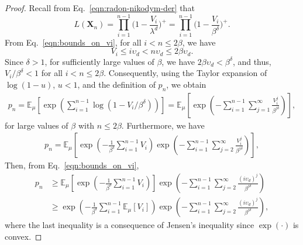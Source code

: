 \documentclass[pdflatex, sn-mathphys-ay]{sn-jnl}%
\renewcommand{\v}[1]{\boldsymbol{#1}}
\newcommand{\ee}{\mathbb{E}}
\newcommand{\mX}{\v{X}}
\newcommand{\lt}{\left}
\newcommand{\rt}{\right}
\theoremstyle{thmstyleone}%
\theoremstyle{thmstyletwo}%
\theoremstyle{thmstylethree}%
\begin{document}
\begin{appendices}
\begin{proof}
Recall from Eq.~\eqref{eqn:radon-nikodym-der} that 
\[
L(\mX_n) = \prod_{i=1}^{n-1}\Big(1 - \frac{ V_{i}}{\lambda^d}\Big)^+ = \prod_{i=1}^{n-1}\Big(1 - \frac{ V_{i}}{\beta^\delta}\Big)^+.
\]
From Eq.~\eqref{eqn:bounds_on_vi}, for all $i < n \leq 2\beta$, we have 
\[
V_i \leq i\upsilon_d < n \upsilon_d \leq 2\beta \upsilon_d.
\]
Since $\delta > 1$, for sufficiently large values of $\beta$, we have 
$2\beta \upsilon_d < \beta^{\delta}$, and thus, $V_i/\beta^\delta < 1$ for all $i < n \leq 2\beta$.
Consequently, using the Taylor expansion of $\log(1 - u)$, $u < 1$, and the definition of $p_n$, we obtain
\begin{align*}
    p_n = \ee_\mu \lt[\exp\lt( \sum_{i = 1}^{n -1} \log(1 - V_i/\beta^{\delta})\rt) \rt]
        = \ee_\mu \lt[\exp\lt( - \sum_{i = 1}^{n -1} \sum_{j = 1}^\infty \frac{V_i^j}{\beta^{j\delta}}\rt) \rt],
\end{align*}
for large values of $\beta$ with $n \leq 2\beta$. Furthermore, we have
\begin{align*}
    p_n = \ee_\mu \lt[\exp\lt( - \frac{1}{\beta^{\delta}}\sum_{i = 1}^{n -1} V_i\rt) \exp\lt( - \sum_{i = 1}^{n -1} \sum_{j = 2}^\infty \frac{V_i^j}{\beta^{j\delta}}\rt) \rt],
\end{align*}
Then, from Eq.~\eqref{eqn:bounds_on_vi}, 
\begin{align*}
    p_n &\geq \ee_\mu \lt[\exp\lt( - \frac{1}{\beta^{\delta}}\sum_{i = 1}^{n -1} V_i\rt) \rt] \exp\lt( - \sum_{i = 1}^{n -1} \sum_{j = 2}^\infty \frac{(i\upsilon_d)^j}{\beta^{j\delta}}\rt)\\
        &\geq \exp\lt( - \frac{1}{\beta^{\delta}}\sum_{i = 1}^{n -1} \ee_\mu[V_i]\rt) \exp\lt( - \sum_{i = 1}^{n -1} \sum_{j = 2}^\infty \frac{(i\upsilon_d)^j}{\beta^{j\delta}}\rt),
\end{align*}
where the last inequality 
is a consequence of Jensen's inequality since $\exp(\cdot)$ is convex.
\end{proof} 


\end{appendices}
\end{document}
